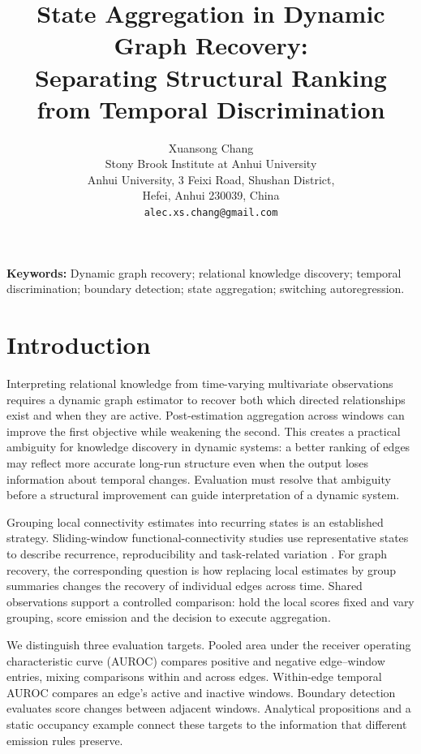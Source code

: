 \documentclass[11pt]{article}
\title{State Aggregation in Dynamic Graph Recovery:\\
Separating Structural Ranking from Temporal Discrimination}
\author{Xuansong Chang\\
\small Stony Brook Institute at Anhui University\\
\small Anhui University, 3 Feixi Road, Shushan District,\\
\small Hefei, Anhui 230039, China\\
\small\texttt{alec.xs.chang@gmail.com}}
\date{}
\renewcommand{\baselinestretch}{2}
\begin{document}
\begingroup
\renewcommand{\baselinestretch}{1}\selectfont
\maketitle
\endgroup
\begin{abstract}

\end{abstract}
\noindent\textbf{Keywords:} Dynamic graph recovery; relational knowledge discovery;
temporal discrimination; boundary detection; state aggregation; switching
autoregression.

\section{Introduction}
\label{sec:intro}
Interpreting relational knowledge from time-varying multivariate observations
requires a dynamic graph estimator to recover both which directed relationships
exist and when they are active. Post-estimation aggregation across windows can
improve the first objective while weakening the second. This creates a
practical ambiguity for knowledge discovery in dynamic systems: a better ranking of edges may reflect more accurate long-run structure even when the output loses information about temporal changes. Evaluation must resolve that ambiguity before a structural improvement can guide interpretation of a dynamic system.

Grouping local connectivity estimates into recurring states is an established
strategy. Sliding-window functional-connectivity studies use representative
states to describe recurrence, reproducibility and task-related variation
\citep{allen2014tracking,abrol2017replicability,chang2026neurocognitive}.
For graph recovery, the corresponding question is how replacing local estimates
by group summaries changes the recovery of individual edges across time.
Shared observations support a controlled comparison: hold the local scores
fixed and vary grouping, score emission and the decision to execute aggregation.

We distinguish three evaluation targets. Pooled area under the receiver
operating characteristic curve (AUROC) compares positive and negative
edge--window entries, mixing comparisons within and across edges.
Within-edge temporal AUROC compares an edge's active and inactive windows.
Boundary detection evaluates score changes between adjacent windows.
Analytical propositions and a static occupancy example connect these targets
to the information that different emission rules preserve.
\end{document}

